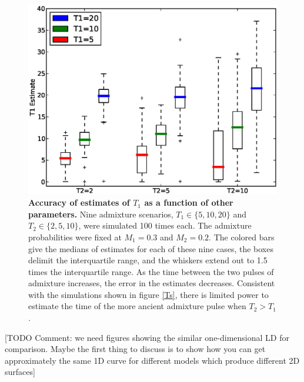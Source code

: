 \begin{table}
\begin{table}
\begin{figure} \includegraphics[scale=.6]{estimates.eps} \caption{ {\bf Accuracy
of estimates of $T_1$ as a function of other parameters.} Nine admixture
scenarios, $T_1\in \{5,10,20\}$ and $T_2\in\{2,5,10\}$, were simulated 100 times
each. The admixture probabilities were fixed at $M_1=0.3$ and $M_2=0.2$. The
colored bars give the medians of estimates for each of these nine cases, the
boxes delimit the interquartile range, and the whiskers extend out to 1.5 times
the interquartile range. As the time between the two pulses of admixture
increases, the error in the estimates decreases. Consistent with the simulations
shown in figure \ref{Ts}, there is limited power to estimate the time of the
more ancient admixture pulse when $T_2>T_1$. } \label{estimates} \end{figure}

[TODO Comment: we need  figures showing the similar one-dimensional LD for
comparison.  Maybe the first thing to discuss is to show how you can get
approximately the same 1D curve for different models which produce different 2D
surfaces]


\end{table}
\end{table}
